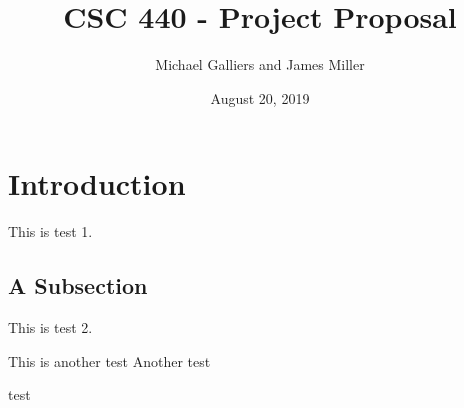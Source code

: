 \documentclass{article}
\author{Michael Galliers and James Miller}
\title{CSC 440 - Project Proposal}
\date{August 20, 2019}
\begin{document}
\begin{titlepage}
\maketitle
\end{titlepage}

\tableofcontents

\section{Introduction}
This is test 1.
\subsection{A Subsection}
This is test 2.

This is another test
\clearpage
Another test

test
\end{document}
